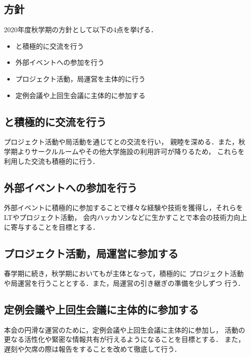 \subsection*{\newGradeIfKouki{}\secondGrade{}方針}


2020年度秋学期の\secondGrade{}方針として以下の4点を挙げる．

\begin{itemize}
    \item \firstGrade{}と積極的に交流を行う
    \item 外部イベントへの参加を行う
    \item プロジェクト活動，局運営を主体的に行う
    \item 定例会議や上回生会議に主体的に参加する
\end{itemize}

\subsection*{\firstGrade{}と積極的に交流を行う}
プロジェクト活動や局活動を通じて\firstGrade{}との交流を行い，
親睦を深める．また，秋学期よりサークルルームやその他大学施設の利用許可が降りるため，
これらを利用した交流も積極的に行う．

\subsection*{外部イベントへの参加を行う}
外部イベントに積極的に参加することで様々な経験や技術を獲得し，それらをLTやプロジェクト活動，
会内ハッカソンなどに生かすことで本会の技術力向上に寄与することを目標とする．

\subsection*{プロジェクト活動，局運営に参加する}
春学期に続き，秋学期においても\secondGrade{}が主体となって，積極的に
プロジェクト活動や局運営を行うこととする．また，局運営の引き継ぎの準備を少しずつ
行う．

\subsection*{定例会議や上回生会議に主体的に参加する}
本会の円滑な運営のために，定例会議や上回生会議に主体的に参加し，
活動の更なる活性化や緊密な情報共有が行えるようになることを目標とする．
また，遅刻や欠席の際は報告をすることを改めて徹底して行う．
